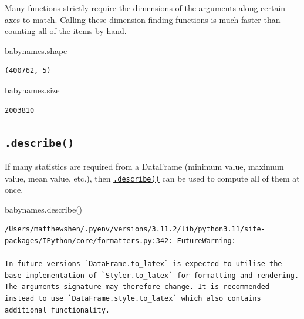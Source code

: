 \documentclass[
  letterpaper,
  DIV=11,
  numbers=noendperiod]{scrreprt}
\newenvironment{Shaded}{\begin{snugshade}}{\end{snugshade}}
\newcommand{\NormalTok}[1]{\textcolor[rgb]{0.00,0.23,0.31}{#1}}
\begin{document}
Many functions strictly require the dimensions of the arguments along
certain axes to match. Calling these dimension-finding functions is much
faster than counting all of the items by hand.

\begin{Shaded}
\begin{Highlighting}[]
\NormalTok{babynames.shape}
\end{Highlighting}
\end{Shaded}

\begin{verbatim}
(400762, 5)
\end{verbatim}

\begin{Shaded}
\begin{Highlighting}[]
\NormalTok{babynames.size}
\end{Highlighting}
\end{Shaded}

\begin{verbatim}
2003810
\end{verbatim}

\hypertarget{describe}{%
\subsection{\texorpdfstring{\texttt{.describe()}}{.describe()}}\label{describe}}

If many statistics are required from a DataFrame (minimum value, maximum
value, mean value, etc.), then
\href{https://pandas.pydata.org/docs/reference/api/pandas.DataFrame.describe.html}{\texttt{.describe()}}
can be used to compute all of them at once.

\begin{Shaded}
\begin{Highlighting}[]
\NormalTok{babynames.describe()}
\end{Highlighting}
\end{Shaded}

\begin{verbatim}
/Users/matthewshen/.pyenv/versions/3.11.2/lib/python3.11/site-packages/IPython/core/formatters.py:342: FutureWarning:

In future versions `DataFrame.to_latex` is expected to utilise the base implementation of `Styler.to_latex` for formatting and rendering. The arguments signature may therefore change. It is recommended instead to use `DataFrame.style.to_latex` which also contains additional functionality.
\end{verbatim}
\end{document}

